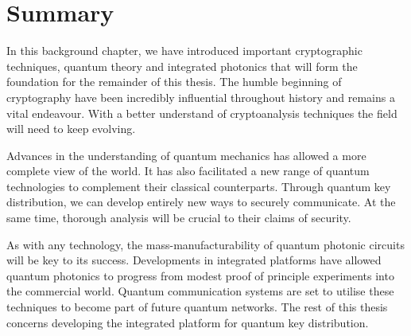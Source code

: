 






\section{Summary}

In this background chapter, we have introduced important cryptographic techniques, quantum theory and integrated photonics that will form the foundation for the remainder of this thesis. The humble beginning of cryptography have been incredibly influential throughout history and remains a vital endeavour. With a better understand of cryptoanalysis techniques the field will need to keep evolving.

Advances in the understanding of quantum mechanics has allowed a more complete view of the world. It has also facilitated a new range of quantum technologies to complement their classical counterparts. Through quantum key distribution, we can develop entirely new ways to securely communicate. At the same time, thorough analysis will be crucial to their claims of security.

As with any technology, the mass-manufacturability of quantum photonic circuits will be key to its success. Developments in integrated platforms have allowed quantum photonics to progress from modest proof of principle experiments into the commercial world. Quantum communication systems are set to utilise these techniques to become part of future quantum networks. The rest of this thesis concerns developing the integrated platform for quantum key distribution.

